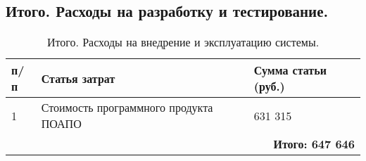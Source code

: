 \subsection{Итого. Расходы на разработку  и тестирование.}
\begin{table}[tbh]
	\caption{Итого. Расходы на внедрение и эксплуатацию системы.}
    \centering
        \begin{tabular}{|l|l|l|}
        		\hline
        		\textnumero п/п & Статья затрат & Сумма статьи (руб.) \\
        		\hline
        		1 & Стоимость программного продукта ПОАПО & 631 315 \\
        		\hline
        		\multicolumn{3}{|r|}{\textbf{Итого: 647 646} }\\
        		\hline
        \end{tabular}   		
\end{table}